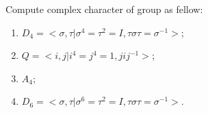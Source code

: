 \documentclass{ctexart}
\newif\ifpreface
\begin{document}
\large
\setlength{\baselineskip}{1.2em}
\ifpreface
    
\else
\maketitle
\fi
{}
\begin{problem}
  Compute complex character of group as fellow:
  \begin{enumerate}
    \item \(D_4 = < \sigma, \tau | \sigma^4=\tau^2=I, \tau \sigma \tau = \sigma^{-1}>\);
    \item \(Q = <i,j| i^4=j^4=1, jij^{-1}>\);
    \item \(A_4\);
    \item \(D_6=< \sigma, \tau | \sigma^6=\tau^2=I, \tau \sigma \tau =\sigma^{-1}>\).
  \end{enumerate}
\end{problem}
  
\end{document}
